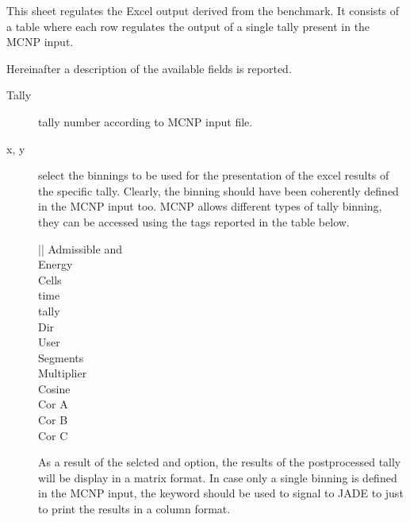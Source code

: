 \documentclass[letterpaper,10pt,english]{sphinxmanual}
\begin{document}
This sheet regulates the Excel output derived from the benchmark. It consists of a table where each row regulates
the output of a single tally present in the MCNP input.

Hereinafter a description of the available fields is reported.
\begin{description}
\item[{Tally}] \leavevmode
tally number according to MCNP input file.

\item[{x, y}] \leavevmode
select the binnings to be used for the presentation of the excel results of the specific tally. Clearly,
the binning should have been coherently defined in the MCNP input too. MCNP allows different types of tally binning,
they can be accessed using the tags reported in the table below.


\begin{savenotes}\sphinxattablestart
\centering
{}
\sphinxthecaptionisattop
{}\label{\detokenize{usage/configuration:id1}}
\sphinxaftertopcaption
\begin{tabular}[t]{||}
\hline
\sphinxstyletheadfamily 
Admissible  and 
\\
\hline
Energy
\\
\hline
Cells
\\
\hline
time
\\
\hline
tally
\\
\hline
Dir
\\
\hline
User
\\
\hline
Segments
\\
\hline
Multiplier
\\
\hline
Cosine
\\
\hline
Cor A
\\
\hline
Cor B
\\
\hline
Cor C
\\
\hline
\end{tabular}
\par
\sphinxattableend\end{savenotes}

As a result of the selcted  and  option, the results of the post\sphinxhyphen{}processed tally will be display in a
matrix format. In case only a single binning is defined in the MCNP input, the  keyword should be used to
signal to JADE to just to print the results in a column format.


\end{description}
\end{document}
